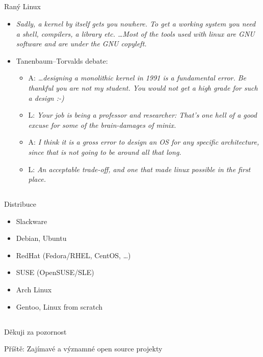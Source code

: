 \documentclass{beamer}
\begin{document}
\subsection{}
\begin{frame}{Raný Linux}
\begin{itemize}
\item {\em Sadly, a kernel by itself gets you nowhere. To get a working system you need a shell, compilers, a library etc. \dots Most of the tools used with linux are GNU software and are under the GNU copyleft.}
\item Tanenbaum--Torvalds debate:
\begin{itemize}
\item A: {\em \dots{}designing a monolithic kernel in 1991 is
a fundamental error.  Be thankful you are not my student.  You would not
get a high grade for such a design :-) }
\item L: {\em Your job is being a professor and researcher: That's one hell of a
good excuse for some of the brain-damages of minix. }
\item A: {\em I think it is a gross error to design an OS for any specific architecture, since that is not going to be around all that long. }
\item L: {\em An acceptable trade-off, and one that made linux possible in the first place. }
\end{itemize}
\end{itemize}
\end{frame}

\subsection{}
\begin{frame}{Distribuce}
\begin{itemize}
\item Slackware
\item Debian, Ubuntu
\item RedHat (Fedora/RHEL, CentOS, \dots)
\item SUSE (OpenSUSE/SLE)
\item Arch Linux
\item Gentoo, Linux from scratch
\end{itemize}
\end{frame}


\subsection{}
\begin{frame}{Děkuji za pozornost}
\begin{center}
Příště: Zajímavé a významné open source projekty
\end{center}
\end{frame}
\end{document}
